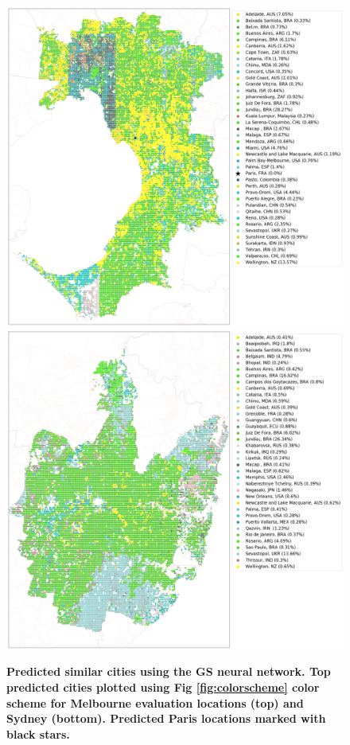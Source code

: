 \documentclass[10pt,letterpaper]{article}
\begin{document}
\begin{figure}[!htbp]
\centering    
\includegraphics[scale=0.16]{Images/MelbourneOverallAbrev_sat.png} 
\includegraphics[scale=0.16]{Images/SydneyOverallAbrev_sat.png}  
\caption{\bf Predicted similar cities using the GS neural network. Top predicted cities plotted using Fig \ref{fig:colorscheme} color scheme for Melbourne evaluation locations (top) and Sydney (bottom). Predicted Paris locations marked with black stars.} 
 \label{fig:melsat}  
\end{figure} 
\end{document}
